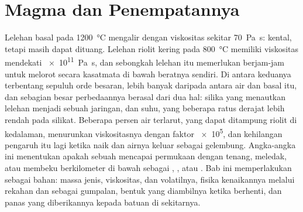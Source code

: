 \chapter{Magma dan Penempatannya}\label{ch:b2:magma-emplacement}

Lelehan basal pada \qty{1200}{\celsius} mengalir dengan viskositas sekitar
\qty{70}{Pa.s}: kental, tetapi masih dapat dituang. Lelehan riolit kering pada \qty{800}{\celsius}
memiliki viskositas mendekati \qty{e11}{Pa.s}, dan sebongkah lelehan itu memerlukan berjam-jam untuk melorot
secara kasatmata di bawah beratnya sendiri. Di antara keduanya terbentang sepuluh orde besaran, lebih
banyak daripada antara air dan basal itu, dan sebagian besar perbedaannya berasal dari dua
hal: silika yang menautkan lelehan menjadi sebuah jaringan, dan suhu,
yang beberapa ratus derajat lebih rendah pada  silikat. Beberapa persen
air terlarut, yang dapat ditampung  riolit di kedalaman, menurunkan viskositasnya
dengan faktor \num{e5}, dan kehilangan pengaruh itu lagi ketika  naik dan
airnya keluar sebagai gelembung. Angka-angka ini menentukan apakah sebuah  mencapai
permukaan dengan tenang, meledak, atau membeku berkilometer di bawah sebagai , , atau
. Bab ini memperlakukan  sebagai bahan: massa jenis, viskositas, dan
volatilnya, fisika kenaikannya melalui rekahan dan sebagai gumpalan, bentuk yang
diambilnya ketika berhenti, dan panas yang diberikannya kepada batuan di sekitarnya.

